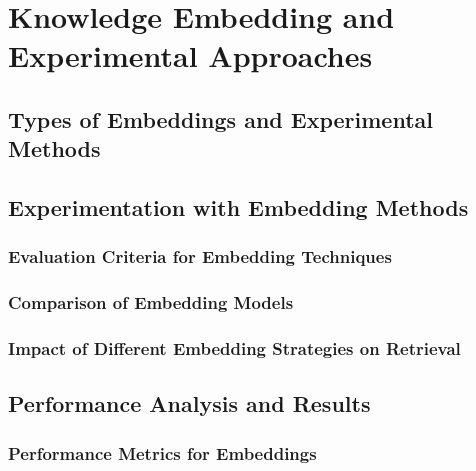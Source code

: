 \chapter{Knowledge Embedding and Experimental Approaches}
\section{Types of Embeddings and Experimental Methods}

\section{Experimentation with Embedding Methods}

    \subsection{Evaluation Criteria for Embedding Techniques}
    \subsection{Comparison of Embedding Models}
    \subsection{Impact of Different Embedding Strategies on Retrieval}

\section{Performance Analysis and Results}
    \subsection{Performance Metrics for Embeddings}
